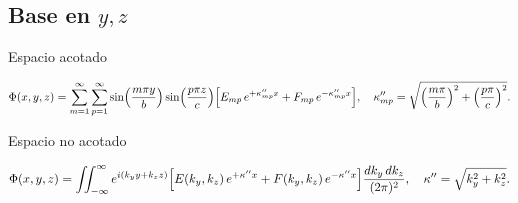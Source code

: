\documentclass[12pt,a4paper]{article}
\begin{document}
\subsection{Base en $y,z$}


Espacio acotado

\begin{equation}
\Phi(x,y,z)
=\sum_{m=1}^{\infty}\sum_{p=1}^{\infty}
\sin\Bigl(\frac{m\pi y}{b}\Bigr)
\sin\Bigl(\frac{p\pi z}{c}\Bigr)
\Bigl[
E_{mp}\,e^{+\kappa''_{mp}x}
+ F_{mp}\,e^{-\kappa''_{mp}x}
\Bigr],
\quad
\kappa''_{mp}
=\sqrt{\Bigl(\frac{m\pi}{b}\Bigr)^{2}+\Bigl(\frac{p\pi}{c}\Bigr)^{2}}.
\end{equation}


Espacio no acotado

\begin{equation}
\Phi(x,y,z)
=\iint_{-\infty}^{\infty}
 e^{i(k_y y + k_z z)}
\Bigl[
E(k_y,k_z)\,e^{+\kappa'' x}
+ F(k_y,k_z)\,e^{-\kappa'' x}
\Bigr]
\frac{dk_y\,dk_z}{(2\pi)^2},
\quad
\kappa''=\sqrt{k_y^2+k_z^2}.
\end{equation}
\end{document}
